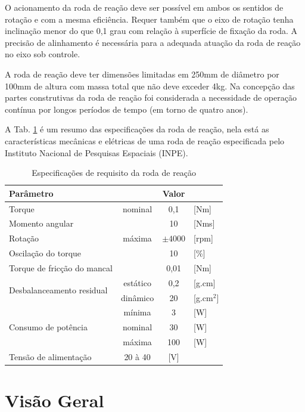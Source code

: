 O acionamento da roda de reação deve ser possível em ambos os sentidos de rotação e com a mesma eficiência. Requer também que o eixo de rotação tenha inclinação menor do que 0,1 grau com relação à superfície de fixação da roda. A precisão de alinhamento é necessária para a adequada atuação da roda de reação no eixo sob controle.

A roda de reação deve ter dimensões limitadas em 250mm de diâmetro por 100mm de altura com massa total que não deve exceder 4kg. Na concepção das partes construtivas da roda de reação foi considerada a necessidade de operação contínua por longos períodos de tempo (em torno de quatro anos).

A Tab. \ref{tab:PMM:especificações} é um resumo das especificações da roda de reação, nela está as características mecânicas e elétricas de uma roda de reação especificada pelo Instituto Nacional de Pesquisas Espaciais (INPE).

\begin{table}[!ht]
    \centering
    \begin{tabular}{l c c l }
		Parâmetro & & Valor &   \\
       	\hline \hline
 		Torque   					& nominal	  & 0,1 & [Nm]  \\
 		Momento angular  			&	  & 10 &      [Nms] \\
 		Rotação 					& máxima		  & $\pm4000$ & [rpm] \\
 		Oscilação do torque 		&		  & 10  & [\%] \\
 		Torque de fricção do mancal &		  & 0,01 & [Nm] \\
 		\multirow{2}{*}{Desbalanceamento residual} & estático & 0,2 & [g.cm]\\
 		& dinâmico & 20  & [g.cm$^{2}$]  \\
 		\multirow{3}{*}{Consumo de potência} 
 		& mínima & 3 & [W] 	 \\
 		& nominal & 30 & [W] \\
 		& máxima & 100 & [W] 	\\	
 		Tensão de alimentação  & 20 à 40 & [V]  \\
    \end{tabular}
    \caption{Especificações de requisito da roda de reação}
    \label{tab:PMM:especificações}
\end{table}



\section{Visão Geral}

